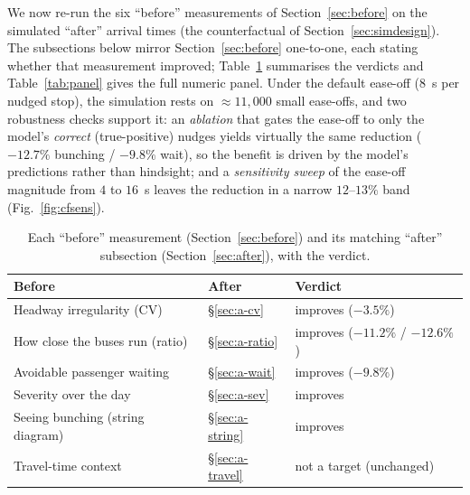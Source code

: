 \documentclass[11pt,a4paper]{article}
\begin{document}
We now re-run the six ``before'' measurements of Section~\ref{sec:before} on the simulated ``after''
arrival times (the counterfactual of Section~\ref{sec:simdesign}). The subsections below mirror
Section~\ref{sec:before} one-to-one, each stating whether that measurement improved;
Table~\ref{tab:mirror} summarises the verdicts and Table~\ref{tab:panel} gives the full numeric
panel. Under the default ease-off ($8$~s per nudged stop), the simulation rests on $\approx$$11{,}000$
small ease-offs, and two robustness checks support it: an \emph{ablation} that gates the ease-off to
only the model's \emph{correct} (true-positive) nudges yields virtually the same reduction
($-12.7\%$ bunching / $-9.8\%$ wait), so the benefit is driven by the model's predictions rather than
hindsight; and a \emph{sensitivity sweep} of the ease-off magnitude from $4$ to $16$~s leaves the
reduction in a narrow $12$--$13\%$ band (Fig.~\ref{fig:cfsens}).

\begin{table}[htbp]
\centering
\small
\caption{Each ``before'' measurement (Section~\ref{sec:before}) and its matching ``after''
subsection (Section~\ref{sec:after}), with the verdict.}
\label{tab:mirror}
\begin{tabular}{lll}
\toprule
Before & After & Verdict \\
\midrule
Headway irregularity (CV)        & §\ref{sec:a-cv}     & improves ($-3.5\%$) \\
How close the buses run (ratio)  & §\ref{sec:a-ratio}  & improves ($-11.2\%$ / $-12.6\%$) \\
Avoidable passenger waiting      & §\ref{sec:a-wait}   & improves ($-9.8\%$) \\
Severity over the day            & §\ref{sec:a-sev}    & improves \\
Seeing bunching (string diagram) & §\ref{sec:a-string} & improves \\
Travel-time context              & §\ref{sec:a-travel} & not a target (unchanged) \\
\bottomrule
\end{tabular}
\end{table}
\end{document}
